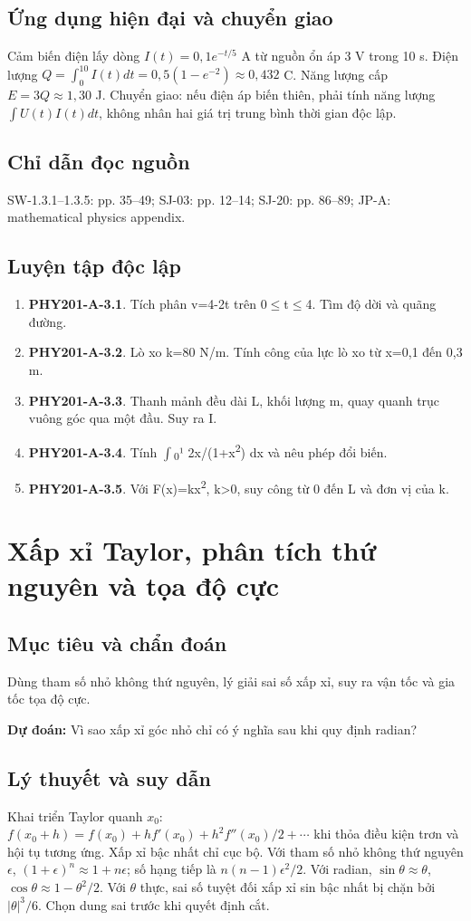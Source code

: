 \documentclass[11pt,a4paper,openany]{book}
\begin{document}
\section{Ứng dụng hiện đại và chuyển giao}
Cảm biến điện lấy dòng $I(t)=0{,}1e^{-t/5}$ A từ nguồn ổn áp 3 V trong 10 s. Điện lượng $Q=\int_0^{10}I(t)dt=0{,}5(1-e^{-2})\approx0{,}432$ C. Năng lượng cấp $E=3Q\approx1{,}30$ J. Chuyển giao: nếu điện áp biến thiên, phải tính năng lượng $\int U(t)I(t)dt$, không nhân hai giá trị trung bình thời gian độc lập.
\section{Chỉ dẫn đọc nguồn}
SW-1.3.1–1.3.5: pp. 35–49; SJ-03: pp. 12–14; SJ-20: pp. 86–89; JP-A: mathematical physics appendix.
\section{Luyện tập độc lập}
\begin{enumerate}
\item \textbf{PHY201-A-3.1}. Tích phân v=4-2t trên 0\ensuremath{\le}t\ensuremath{\le}4. Tìm độ dời và quãng đường.
\item \textbf{PHY201-A-3.2}. Lò xo k=80 N/m. Tính công của lực lò xo từ x=0,1 đến 0,3 m.
\item \textbf{PHY201-A-3.3}. Thanh mảnh đều dài L, khối lượng m, quay quanh trục vuông góc qua một đầu. Suy ra I.
\item \textbf{PHY201-A-3.4}. Tính \ensuremath{\int}\textsubscript{0}¹ 2x/(1+x\textsuperscript{2}) dx và nêu phép đổi biến.
\item \textbf{PHY201-A-3.5}. Với F(x)=kx\textsuperscript{2}, k>0, suy công từ 0 đến L và đơn vị của k.
\end{enumerate}
\chapter{Xấp xỉ Taylor, phân tích thứ nguyên và tọa độ cực}
\section{Mục tiêu và chẩn đoán}
Dùng tham số nhỏ không thứ nguyên, lý giải sai số xấp xỉ, suy ra vận tốc và gia tốc tọa độ cực.

\textbf{Dự đoán:} Vì sao xấp xỉ góc nhỏ chỉ có ý nghĩa sau khi quy định radian?
\section{Lý thuyết và suy dẫn}
Khai triển Taylor quanh $x_0$: $f(x_0+h)=f(x_0)+hf'(x_0)+h^2f''(x_0)/2+\cdots$ khi thỏa điều kiện trơn và hội tụ tương ứng. Xấp xỉ bậc nhất chỉ cục bộ. Với tham số nhỏ không thứ nguyên $\epsilon$, $(1+\epsilon)^n\approx1+n\epsilon$; số hạng tiếp là $n(n-1)\epsilon^2/2$. Với radian, $\sin\theta\approx\theta$, $\cos\theta\approx1-\theta^2/2$. Với $\theta$ thực, sai số tuyệt đối xấp xỉ sin bậc nhất bị chặn bởi $|\theta|^3/6$. Chọn dung sai trước khi quyết định cắt.
\end{document}
